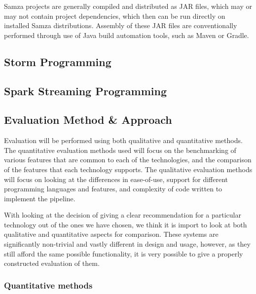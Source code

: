 Samza projects are generally compiled and distributed as JAR files, which may or may not contain project dependencies,
which then can be run directly on installed Samza distributions. Assembly of these JAR files are conventionally performed
through use of Java build automation tools, such as Maven or Gradle.



\subsection{Storm Programming} %
\label{sub:storm_programming}



\subsection{Spark Streaming Programming} %
\label{sub:spark_streaming_programming}





\subsection{Evaluation Method \& Approach} %
\label{sub:evaluation_method_approach}

Evaluation will be performed using both qualitative and quantitative methods. The quantitative evaluation methods used will focus
on the benchmarking of various features that are common to each of the technologies, and the comparison of the features that
each technology supports. The qualitative evaluation methods will focus on looking at the differences in ease-of-use,
support for different programming languages and features, and complexity of code written to implement the pipeline.

With looking at the decision of giving a clear recommendation for a particular technology out of the ones we have chosen,
we think it is import to look at both qualitative and quantitative aspects for comparison. These systems are significantly
non-trivial and vastly different in design and usage, however, as they still afford the same possible functionality,
it is very possible to give a properly constructed evaluation of them.


\subsubsection{Quantitative methods} %
\label{ssub:quantitative_methods}



